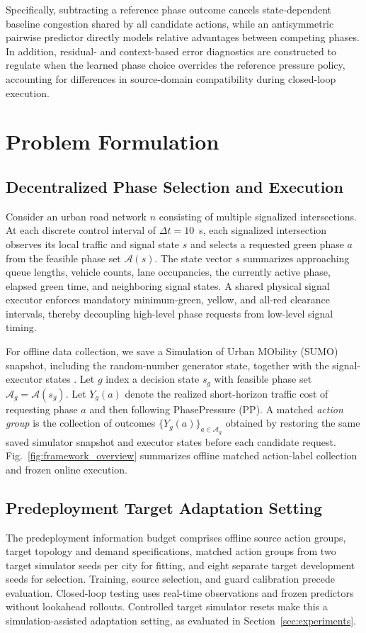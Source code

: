 \documentclass[letterpaper,journal]{IEEEtran}
\begin{document}
Specifically, subtracting a reference phase outcome cancels state-dependent baseline congestion shared by all candidate actions, while an antisymmetric pairwise predictor directly models relative advantages between competing phases. In addition, residual- and context-based error diagnostics are constructed to regulate when the learned phase choice overrides the reference pressure policy, accounting for differences in source-domain compatibility during closed-loop execution.

\section{Problem Formulation}
\label{sec:problem}
\subsection{Decentralized Phase Selection and Execution}
Consider an urban road network $n$ consisting of multiple signalized intersections. At each discrete control interval of $\Delta t = 10$~s, each signalized intersection observes its local traffic and signal state $s$ and selects a requested green phase $a$ from the feasible phase set $\mathcal A(s)$. The state vector $s$ summarizes approaching queue lengths, vehicle counts, lane occupancies, the currently active phase, elapsed green time, and neighboring signal states. A shared physical signal executor enforces mandatory minimum-green, yellow, and all-red clearance intervals, thereby decoupling high-level phase requests from low-level signal timing.

For offline data collection, we save a Simulation of Urban MObility (SUMO) snapshot, including the random-number generator state, together with the signal-executor states \cite{lopez2018microscopic}. Let $g$ index a decision state $s_g$ with feasible phase set $\mathcal A_g=\mathcal A(s_g)$. Let $Y_g(a)$ denote the realized short-horizon traffic cost of requesting phase $a$ and then following PhasePressure (PP). A matched \emph{action group} is the collection of outcomes $\{Y_g(a)\}_{a\in\mathcal A_g}$ obtained by restoring the same saved simulator snapshot and executor states before each candidate request. Fig.~\ref{fig:framework_overview} summarizes offline matched action-label collection and frozen online execution.

\subsection{Predeployment Target Adaptation Setting}
The predeployment information budget comprises offline source action groups, target topology and demand specifications, matched action groups from two target simulator seeds per city for fitting, and eight separate target development seeds for selection. Training, source selection, and guard calibration precede evaluation. Closed-loop testing uses real-time observations and frozen predictors without lookahead rollouts. Controlled target simulator resets make this a simulation-assisted adaptation setting, as evaluated in Section~\ref{sec:experiments}.
\end{document}
